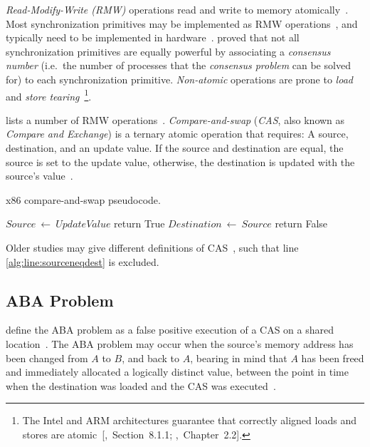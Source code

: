 \emph{Read-Modify-Write (RMW)} operations read and write to memory
atomically~\citep{perfbook2021}. Most synchronization primitives may be
implemented as RMW operations~\citep[Section~5.6]{herlihy2020art}, and
typically need to be implemented in hardware~\citep[Appendix~B.8]{herlihy2020art}.
\citeauthor{herlihy1991wait} proved that not all synchronization primitives are
equally powerful by associating a \emph{consensus number} (i.e.~the number of
processes that the \emph{consensus problem} can be solved for) to each
synchronization primitive. \emph{Non-atomic} operations are prone to \emph{load} and \emph{store
tearing}~\citep[Section~4.3.4]{perfbook2021}\footnote{The Intel and ARM
architectures guarantee that correctly aligned loads and stores are
atomic~[\citealp{intel2021system},~Section~8.1.1;
\citealp{arm2022architecture},~Chapter~2.2].}.

\citeauthor{scott2013shared} lists a number of RMW operations~\citep[Table~2.2]{scott2013shared}.
\emph{Compare-and-swap} (\emph{CAS}, also known as \emph{Compare and Exchange})
is a ternary atomic operation that requires: A source, destination, and an
update value. If the source and destination are equal, the source is set to the
update value, otherwise, the destination is updated with the source's
value~\citep{intel2021inst}.

\begin{algorithm}
    \caption{x86 compare-and-swap pseudocode.}\label{alg:cas}
    \begin{algorithmic}[1]
                \State $Source~\gets~UpdateValue$
                \State return True
            \EndIf
            \State $Destination~\gets~Source$ \label{alg:line:sourceneqdest}
            \State return False
        \EndFunction
    \end{algorithmic}
\end{algorithm}

Older studies may give different definitions of
CAS~\citetext{\citealp{scott2013shared},~Table~2.2;~\citealp{valois1995datastructures},
Appendix~A}, such that line \ref{alg:line:sourceneqdest} is excluded.

\subsection{ABA Problem}
\citeauthor{dechev2010understanding} define the ABA problem as a false positive
execution of a CAS on a shared location~\citep{dechev2010understanding}. The ABA
problem may occur when the source's memory address has been changed from $A$ to
$B$, and back to $A$, bearing in mind that $A$ has been freed and immediately
allocated a logically distinct value, between the point in time when the
destination was loaded and the CAS was executed~\citep{dechev2010understanding}.

